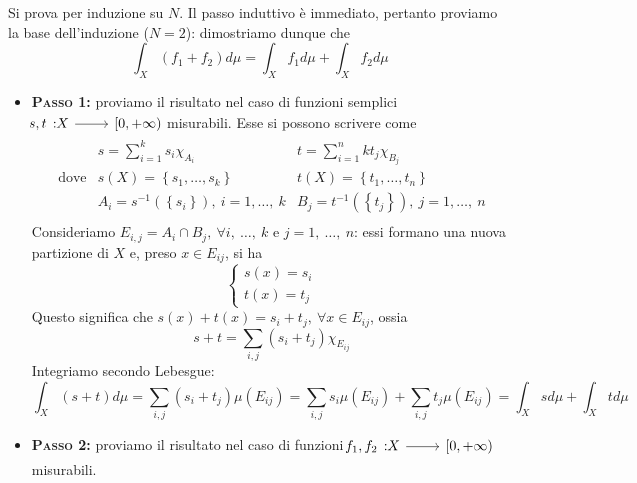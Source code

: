 \begin{demonstration}
	Si prova per induzione su $N$. Il passo induttivo è immediato, pertanto proviamo la base dell'induzione ($N=2$): dimostriamo dunque che
	\begin{equation*}
		\int_X\left(f_1+f_2\right)d\mu=\int_Xf_1d\mu+\int_Xf_2d\mu
	\end{equation*}
		\begin{itemize}
		\item \textbf{\textsc{Passo 1}:} proviamo il risultato nel caso di funzioni semplici $\funz{s,t}{X}{\left[0,+\infty\right)}$ misurabili. Esse si possono scrivere come
		\begin{equation*}
			\begin{array}{lll}
				& \displaystyle s=\sum_{i=1}^{k}s_i\chi_{A_i} & \displaystyle t=\sum_{i=1}^n{k}t_j\chi_{B_j}\\
				\text{dove}& \displaystyle s\left(X\right)=\left\{s_1,\ldots,s_k\right\}&\displaystyle t\left(X\right)=\left\{t_1,\ldots,t_n\right\}\\
				&\displaystyle A_i=s^{-1}\left(\left\{s_i\right\}\right),\ i=1,\ldots,\ k&\displaystyle B_j=t^{-1}\left(\left\{t_j\right\}\right),\ j=1,\ldots,\ n\\
			\end{array}
		\end{equation*}
	Consideriamo $E_{i,j}=A_i\cap B_j,\ \forall i,\ \ldots,\ k$ e $j=1,\ \ldots,\ n$: essi formano una nuova partizione di $X$ e, preso $x\in E_{ij}$, si ha
	\begin{equation*}
		\begin{cases}
			s\left(x\right)=s_i\\
			t\left(x\right)=t_j
		\end{cases}
	\end{equation*}
	Questo significa che $s\left(x\right)+t\left(x\right)=s_i+t_j,\ \forall x\in E_{ij}$, ossia
	\begin{equation*}
		s+t=\sum_{i,j}\left(s_i+t_j\right)\chi_{E_{ij}}
	\end{equation*}
	Integriamo secondo Lebesgue:
	\begin{equation*}
		\int_X\left(s+t\right)d\mu=\sum_{i,j}\left(s_i+t_j\right)\mu\left(E_{ij}\right)=\sum_{i,j}s_i\mu\left(E_{ij}\right)+\sum_{i,j}t_j\mu\left(E_{ij}\right)=\int_Xsd\mu+\int_Xtd\mu
	\end{equation*}
	\item \textbf{\textsc{Passo 2}:} proviamo il risultato nel caso di funzioni $\funz{f_1,f_2}{X}{\left[0,+\infty\right)}$ misurabili.\\

\end{itemize}
\end{demonstration}

